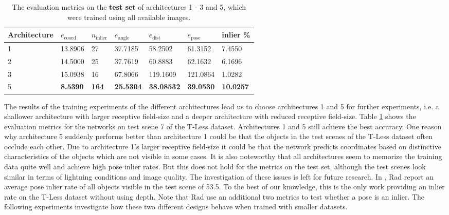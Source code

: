 \begin{table}[b]
\centering
\begin{tabular}{|l||llllll|} \hline
Architecture & $e_{\text{coord}}$ & $n_{\text{inlier}}$ & $e_{\text{angle}}$ & $e_{\text{dist}}$ & $e_{\text{pose}}$ & inlier \% \\ \hline \hline \rowcolor{Gray}
1            & 13.8906   & 27   & 37.7185   & 58.2502  & 61.3152    & 7.4550 \\ \hline
2            & 14.5000   & 25   & 37.7619   & 60.8883  & 62.1632   & 6.1696           \\ \hline \rowcolor{Gray}
3            & 15.0938    & 16   & 67.8066   & 119.1609  & 121.0864   & 1.0282         \\ \hline
5            & \textbf{8.5390}    & \textbf{164}   & \textbf{25.5304}   & \textbf{38.08532}  & \textbf{39.0530} & \textbf{10.0257} \\ \hline       
\end{tabular}
\caption{The evaluation metrics on the \textbf{test set} of architectures 1 - 3 and 5, which were trained using all available images.}
\label{table:architecture_test_metrics_comparison}
\end{table}

The results of the training experiments of the different architectures lead us to choose architectures 1 and 5 for further experiments, i.e. a shallower architecture with larger receptive field-size and a deeper architecture with reduced receptive field-size. Table \ref{table:architecture_test_metrics_comparison} shows the evaluation metrics for the networks on test scene 7 of the T-Less dataset. Architectures 1 and 5 still achieve the best accuracy. One reason why architecture 5 suddenly performs better than architecture 1 could be that the objects in the test scenes of the T-Less dataset often occlude each other. Due to architecture 1's larger receptive field-size it could be that the network predicts coordinates based on distinctive characteristics of the objects which are not visible in some cases. It is also noteworthy that all architectures seem to memorize the training data quite well and achieve high pose inlier rates. But this does not hold for the metrics on the test set, although the test scenes look similar in terms of lightning conditions and image quality. The investigation of these issues is left for future research. In \cite{bb8}, Rad \etal report an average pose inlier rate of all objects visible in the test scene of 53.5. To the best of our knowledge, this is the only work providing an inlier rate on the T-Less dataset without using depth. Note that Rad \etal use an additional two metrics to test whether a pose is an inlier. The following experiments investigate how these two different designs behave when trained with smaller datasets.

